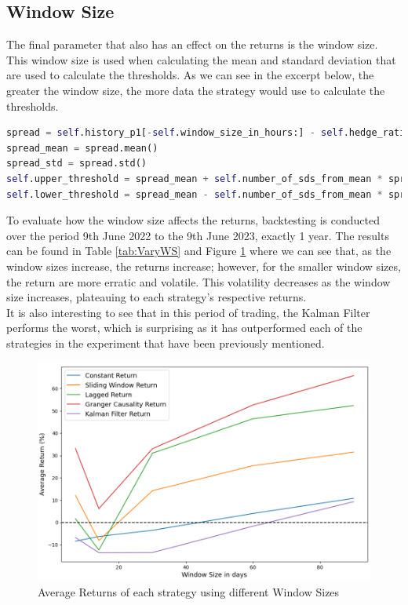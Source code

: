 \subsection{Window Size}
The final parameter that also has an effect on the returns is the window size. This window size is used when calculating the mean and standard deviation that are used to calculate the thresholds. As we can see in the excerpt below, the greater the window size, the more data the strategy would use to calculate the thresholds.
\vspace{5mm}
\begin{lstlisting}[language=Python]
spread = self.history_p1[-self.window_size_in_hours:] - self.hedge_ratio * self.history_p2[-self.window_size_in_hours:]
spread_mean = spread.mean()
spread_std = spread.std()
self.upper_threshold = spread_mean + self.number_of_sds_from_mean * spread_std
self.lower_threshold = spread_mean - self.number_of_sds_from_mean * spread_std
\end{lstlisting}
\vspace{5mm}
To evaluate how the window size affects the returns, backtesting is conducted over the period 9th June 2022 to the 9th June 2023, exactly 1 year. The results can be found in Table \ref{tab:VaryWS} and Figure \ref{fig:VaryWS} where we can see that, as the window sizes increase, the returns increase; however, for the smaller window sizes, the return are more erratic and volatile. This volatility decreases as the window size increases, plateauing to each strategy's respective returns.
\\[3mm]
It is also interesting to see that in this period of trading, the Kalman Filter performs the worst, which is surprising as it has outperformed each of the strategies in the experiment that have been previously mentioned.

\begin{figure}[H]
    \centering
    \includegraphics[width=\linewidth]{evaluation/Images/VarWS.png}
    \caption{Average Returns of each strategy using different Window Sizes}
    \label{fig:VaryWS}
\end{figure}


